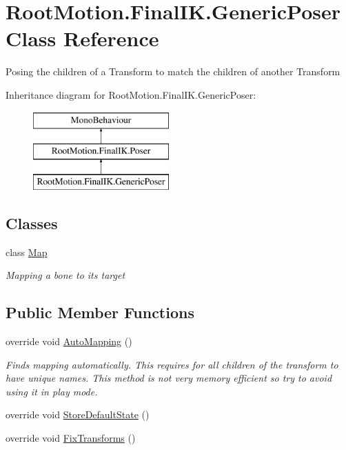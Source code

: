 \hypertarget{class_root_motion_1_1_final_i_k_1_1_generic_poser}{}\section{Root\+Motion.\+Final\+I\+K.\+Generic\+Poser Class Reference}
\label{class_root_motion_1_1_final_i_k_1_1_generic_poser}


Posing the children of a Transform to match the children of another Transform  


Inheritance diagram for Root\+Motion.\+Final\+I\+K.\+Generic\+Poser\+:\begin{figure}[H]
\begin{center}
\leavevmode
\includegraphics[height=3.000000cm]{class_root_motion_1_1_final_i_k_1_1_generic_poser}
\end{center}
\end{figure}
\subsection*{Classes}
\begin{DoxyCompactItemize}
\item 
class \mbox{\hyperlink{class_root_motion_1_1_final_i_k_1_1_generic_poser_1_1_map}{Map}}
\begin{DoxyCompactList}\small\item\em Mapping a bone to it\textquotesingle{}s target \end{DoxyCompactList}\end{DoxyCompactItemize}
\subsection*{Public Member Functions}
\begin{DoxyCompactItemize}
\item 
override void \mbox{\hyperlink{class_root_motion_1_1_final_i_k_1_1_generic_poser_a38993eecf09618c2ade7f3afe8a36ad7}{Auto\+Mapping}} ()
\begin{DoxyCompactList}\small\item\em Finds mapping automatically. This requires for all children of the transform to have unique names. This method is not very memory efficient so try to avoid using it in play mode. \end{DoxyCompactList}\item 
override void \mbox{\hyperlink{class_root_motion_1_1_final_i_k_1_1_generic_poser_a0f4a322e84b4b5101d8a491fa4521f9e}{Store\+Default\+State}} ()
\item 
override void \mbox{\hyperlink{class_root_motion_1_1_final_i_k_1_1_generic_poser_af53f1cc65fae557e3aeaf9dd6b0181b9}{Fix\+Transforms}} ()
\end{DoxyCompactItemize}

